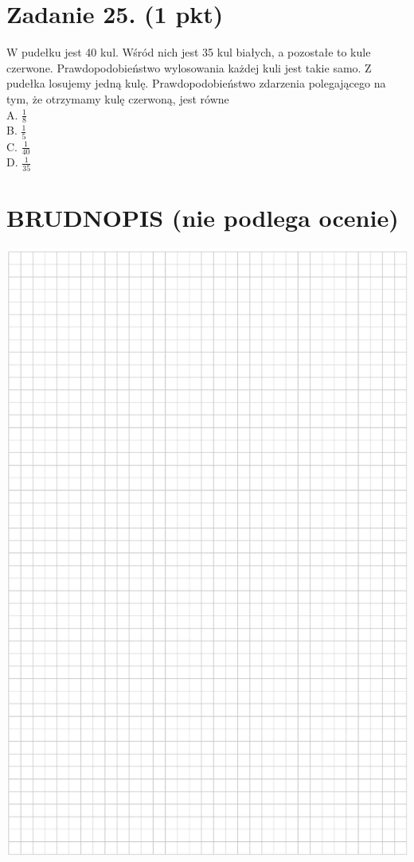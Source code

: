 \documentclass[10pt]{article}
\begin{document}
\section*{Zadanie 25. (1 pkt)}
W pudełku jest 40 kul. Wśród nich jest 35 kul białych, a pozostałe to kule czerwone. Prawdopodobieństwo wylosowania każdej kuli jest takie samo. Z pudełka losujemy jedną kulę. Prawdopodobieństwo zdarzenia polegającego na tym, że otrzymamy kulę czerwoną, jest równe\\
A. \(\frac{1}{8}\)\\
B. \(\frac{1}{5}\)\\
C. \(\frac{1}{40}\)\\
D. \(\frac{1}{35}\)

\section*{BRUDNOPIS (nie podlega ocenie)}
\begin{center}
\includegraphics[max width=\textwidth]{2024_11_21_d51d653f4fe4a5bb0c33g-13}
\end{center}
\end{document}
